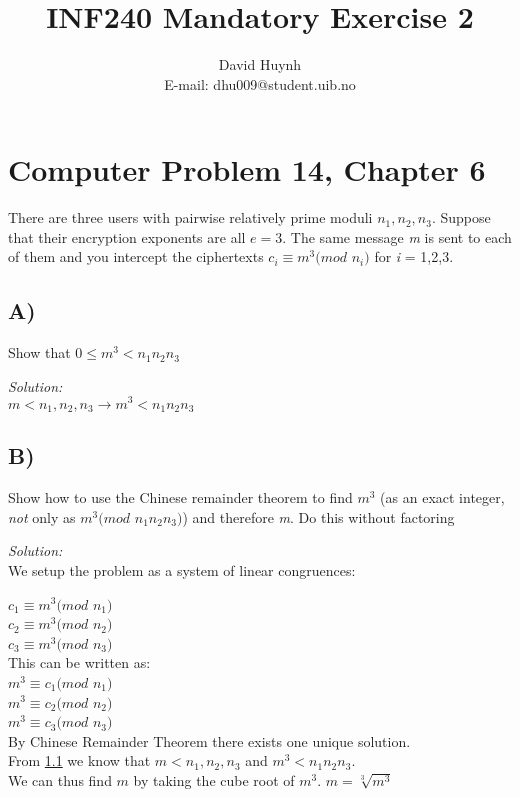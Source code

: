 \documentclass{article}
\begin{document}
\title{INF240 Mandatory Exercise 2}
\author{David Huynh\\E-mail: dhu009@student.uib.no}
\date{}

\maketitle

\section{Computer Problem 14, Chapter 6}
There are three users with pairwise relatively prime moduli $n_{1},n_{2},n_{3}$.
Suppose that their encryption exponents are all $e = 3$. The same message \emph{m} is sent to each of them and 
you intercept the ciphertexts $c_{i} \equiv m^{3}(mod$ $n_{i})$ for \emph{i} = 1,2,3.

\subsection{A)}
\label{a}
Show that $0 \leq m^{3} < n_{1}n_{2}n_{3}$

\emph{Solution:}\\
$m < n_{1},n_{2},n_{3} \rightarrow{m^{3} < n_{1}n_{2}n_{3}}$

\subsection{B)}
\label{b}
Show how to use the Chinese remainder theorem to find $m^{3}$ (as an exact integer, \emph{not} only as 
$m^{3} (mod$ $n_{1}n_{2}n_{3})$) and therefore \emph{m}.
Do this without factoring

\emph{Solution:}\\
We setup the problem as a system of linear congruences:

$c_{1} \equiv m^{3}(mod$ $n_{1})$\\
$c_{2} \equiv m^{3}(mod$ $n_{2})$\\
$c_{3} \equiv m^{3}(mod$ $n_{3})$\\

This can be written as:\\
$m^{3} \equiv c_{1}(mod$ $n_{1})$\\
$m^{3} \equiv c_{2}(mod$ $n_{2})$\\
$m^{3} \equiv c_{3}(mod$ $n_{3})$\\

By Chinese Remainder Theorem there exists one unique solution.\\
From \ref{a} we know that $m < n_{1},n_{2},n_{3}$ and $m^{3} < n_{1}n_{2}n_{3}$.\\
We can thus find $m$ by taking the cube root of $m^{3}$.
$m = \sqrt[3]{m^{3}}$
\end{document}
